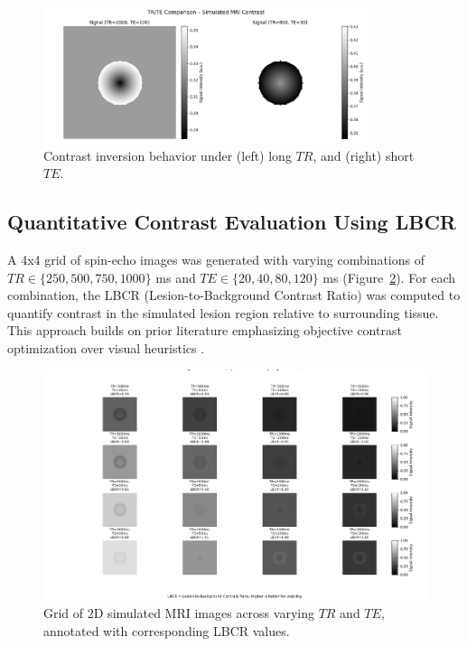 \documentclass[10pt,a4paper,twoside]{article}
\begin{document}
\begin{enumerate}
\begin{figure}[htbp!]
\centering
\includegraphics[width=0.85\textwidth]{trtecomparisonforcontrast.png}
\caption{Contrast inversion behavior under (left) long \( TR \), and (right) short \( TE \).}
\label{fig:inversion}
\end{figure}

\subsection{Quantitative Contrast Evaluation Using LBCR}

A 4x4 grid of spin-echo images was generated with varying combinations of \( TR \in \{250, 500, 750, 1000\} \) ms and \( TE \in \{20, 40, 80, 120\} \) ms (Figure~\ref{fig:grid}). For each combination, the LBCR (Lesion-to-Background Contrast Ratio) was computed to quantify contrast in the simulated lesion region relative to surrounding tissue. This approach builds on prior literature emphasizing objective contrast optimization over visual heuristics \cite{naganawa2002}.

\begin{figure}[htbp!]
\centering
\includegraphics[width=\textwidth]{trtegridwithlbcr.png}
\caption{Grid of 2D simulated MRI images across varying \( TR \) and \( TE \), annotated with corresponding LBCR values.}
\label{fig:grid}
\end{figure}


\end{enumerate}
\end{document}
